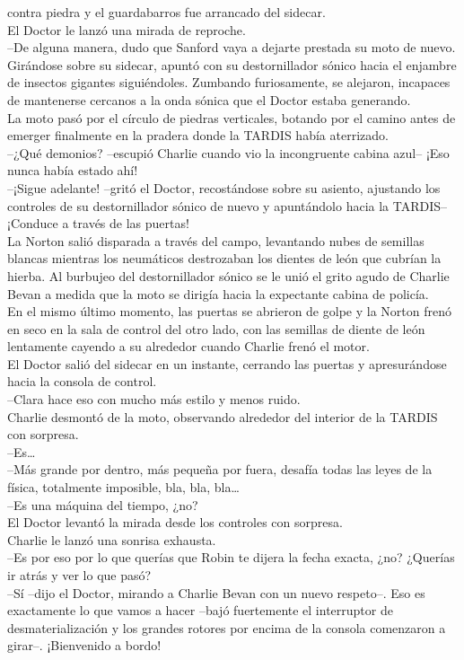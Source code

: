 contra piedra y el guardabarros fue arrancado del sidecar.\\
El Doctor le lanzó una mirada de reproche.\\
--De alguna manera, dudo que Sanford vaya a dejarte prestada su moto de
nuevo.\\
Girándose sobre su sidecar, apuntó con su destornillador sónico hacia el
enjambre de insectos gigantes siguiéndoles. Zumbando furiosamente, se
alejaron, incapaces de mantenerse cercanos a la onda sónica que el
Doctor estaba generando.\\
La moto pasó por el círculo de piedras verticales, botando por el camino
antes de emerger finalmente en la pradera donde la TARDIS había
aterrizado.\\
--¿Qué demonios? --escupió Charlie cuando vio la incongruente cabina
azul-- ¡Eso nunca había estado ahí!\\
--¡Sigue adelante! --gritó el Doctor, recostándose sobre su asiento,
ajustando los controles de su destornillador sónico de nuevo y
apuntándolo hacia la TARDIS-- ¡Conduce a través de las puertas!\\
La Norton salió disparada a través del campo, levantando nubes de
semillas blancas mientras los neumáticos destrozaban los dientes de león
que cubrían la hierba. Al burbujeo del destornillador sónico se le unió
el grito agudo de Charlie Bevan a medida que la moto se dirigía hacia la
expectante cabina de policía.\\
En el mismo último momento, las puertas se abrieron de golpe y la Norton
frenó en seco en la sala de control del otro lado, con las semillas de
diente de león lentamente cayendo a su alrededor cuando Charlie frenó el
motor.\\
El Doctor salió del sidecar en un instante, cerrando las puertas y
apresurándose hacia la consola de control.\\
--Clara hace eso con mucho más estilo y menos ruido.\\
Charlie desmontó de la moto, observando alrededor del interior de la
TARDIS con sorpresa.\\
--Es\ldots{}\\
--Más grande por dentro, más pequeña por fuera, desafía todas las leyes
de la física, totalmente imposible, bla, bla, bla\ldots{}\\
--Es una máquina del tiempo, ¿no?\\
El Doctor levantó la mirada desde los controles con sorpresa.\\
Charlie le lanzó una sonrisa exhausta.\\
--Es por eso por lo que querías que Robin te dijera la fecha exacta,
¿no? ¿Querías ir atrás y ver lo que pasó?\\
--Sí --dijo el Doctor, mirando a Charlie Bevan con un nuevo respeto--.
Eso es exactamente lo que vamos a hacer --bajó fuertemente el
interruptor de desmaterialización y los grandes rotores por encima de la
consola comenzaron a girar--. ¡Bienvenido a bordo!
